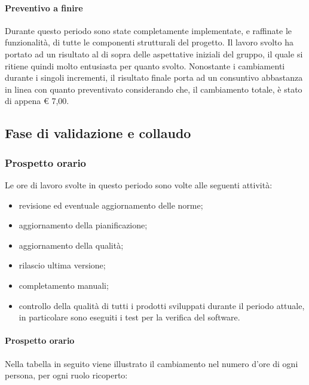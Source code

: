 		\paragraph{Preventivo a finire}
			Durante questo periodo sono state completamente implementate, e raffinate le funzionalità, di tutte le componenti strutturali del progetto. Il lavoro svolto ha portato ad un risultato al di sopra delle aspettative iniziali del gruppo, il quale si ritiene quindi molto entusiasta per quanto svolto. Nonostante i cambiamenti durante i singoli incrementi, il risultato finale porta ad un consuntivo abbastanza in linea con quanto preventivato considerando che, il cambiamento totale, è stato di appena € 7,00.
	
		
		
		\subsection{Fase di validazione e collaudo}
		\subsubsection{Prospetto orario}
		Le ore di lavoro svolte in questo periodo sono volte alle seguenti attività:
		\begin{itemize}
			\item revisione ed eventuale aggiornamento delle norme;
			\item aggiornamento della pianificazione;
			\item aggiornamento della qualità;
			\item rilascio ultima versione;
			\item completamento manuali;
			\item controllo della qualità di tutti i prodotti sviluppati durante il periodo attuale, in particolare sono eseguiti i test per la verifica del software.
		\end{itemize}
		\paragraph{Prospetto orario}
		Nella tabella in seguito viene illustrato il cambiamento nel numero d'ore di ogni persona, per ogni ruolo ricoperto:
		
